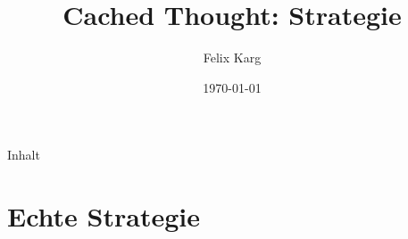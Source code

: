 \documentclass[12pt,compress,ngerman,utf8,t]{beamer}
\date{\today}
\institute{University of Freiburg}
\title{Cached Thought: Strategie}
\author{Felix Karg}
\begin{document}
\maketitle



\begin{frame}{Inhalt}
    \small
    \begin{multicols}{2}
        \small
        \tableofcontents[hidesubsections]
    \end{multicols}
    \clearpage
\end{frame}








\section{Echte Strategie}






\end{document}
